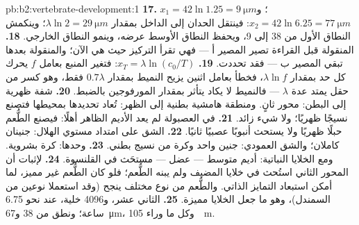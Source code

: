 \begin{solution}{pb:b2:vertebrate-development:1}
\textbf{17.} $x_1 = 42\ln 1.25 = \qty{9}{\micro m}$؛ و$x_2 = 42\ln 6.25
= \qty{77}{\micro m}$: فينتقل الحدان إلى الداخل بمقدار $\lambda\ln 2 =
\qty{29}{\micro m}$؛ وينكمش النطاق الأول من 38 إلى 9، ويحفظ النطاق
الأوسط عرضه، وينمو النطاق الخارجي.
\textbf{18.} المنقولة قبل القراءة تصير المصير أ --- فهي تقرأ
التركيز حيث هي الآن؛ والمنقولة بعدها تبقي المصير ب --- فقد
تحددت.
\textbf{19.} $x_T = \lambda\ln(c_0/T)$: فتغير المنبع بعامل
$f$ يحرك كل حد بمقدار $\lambda\ln f$، فخطأ بعامل اثنين
يزيح النميط بمقدار $0.7\lambda$ فقط، وهو كسر من حقل
يمتد عدة $\lambda$ --- فالنميط لا يكاد يتأثر
بمقدار المورفوجين بالضبط.
\textbf{20.} شفة ظهرية إلى البطن: محور ثانٍ. ومنطقة هامشية
بطنية إلى الظهر: تُعاد تحديدها بمحيطها فتصنع
نسيجًا ظهريًا؛ ولا شيء زائد.
\textbf{21.} في العصبولة لم يعد الأديم الظاهر أهلًا: فيصنع
الطُّعم حبلًا ظهريًا ولا يستحث أنبوبًا عصبيًا ثانيًا.
\textbf{22.} الشق على امتداد مستوي الهلال: جنينان كاملان؛
والشق العمودي: جنين واحد وكرة من نسيج بطني.
\textbf{23.} وحدها: كرة بشروية. ومع الخلايا النباتية: أديم متوسط
--- عضل  --- مستحَث في القلنسوة.
\textbf{24.} لإثبات أن المحور الثاني استُحث في خلايا المضيف
ولم يبنه الطُّعم؛ فلو كان الطُّعم غير مميز،
لما أمكن استبعاد التمايز الذاتي. والطُّعم من
نوع مختلف ينجح (وقد استعملا نوعين من السمندل)، وهو ما
جعل الخلايا مميزة.
\textbf{25.}  الثاني عشر، و4096 خلية، عند نحو 6.75 ساعة؛ ونطق
من 38 و\qty{67}{\micro m}، وكل ما وراء \qty{105}{\micro
m}.
\end{solution}
